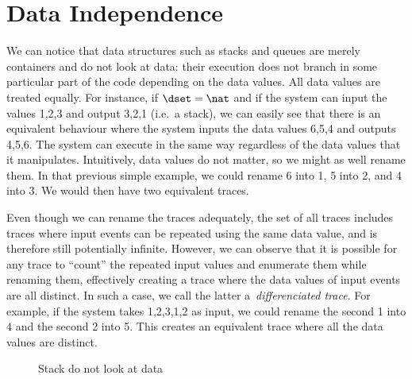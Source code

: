 \section{Data Independence}
\label{section:data:independence}

We can notice that data structures such as stacks and queues are
merely containers and do not look at data: their execution does not
branch in some particular part of the code depending on the data
values. All data values are treated equally. %
%
For instance, if $\dset=\nat$ and if the system can input the values
1,2,3 and output 3,2,1 (i.e.\ a stack), we can easily see that there
is an equivalent behaviour where the system inputs the data values
6,5,4 and outputs 4,5,6. The system can execute in the same way
regardless of the data values that it manipulates.
%
Intuitively, data values do not matter, so we might as well rename
them. In that previous simple example, we could rename 6 into 1, 5
into 2, and 4 into 3. We would then have two equivalent traces.

%
Even though we can rename the traces adequately, %
the set of all traces includes traces where input events can be
repeated using the same data value, and is therefore still potentially
infinite.
%
However, we can observe that it is possible for any trace to ``count''
the repeated input values and enumerate them while renaming them,
effectively creating a trace where the data values of input events are
all distinct. In such a case, we call the latter
a~\emph{differenciated trace}.
%
For example, if the system takes 1,2,3,1,2 as input, we could rename
the second 1 into 4 and the second 2 into 5. This creates an
equivalent trace where all the data values are distinct.

\begingroup%
\setlength{}
\begin{figure}[ht]
  \caption{Stack do not look at data}
  \label{figure:data:independence}
\end{figure}
\endgroup

